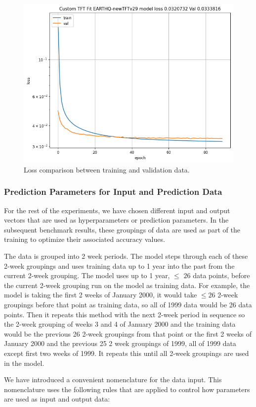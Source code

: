 \documentclass[utf8]{FrontiersinVancouver} %
\begin{document}
\begin{figure}[htb]
    \centering
    \includegraphics[width=0.70\columnwidth]{images/loss90.png}
    \caption{Loss comparison between training and validation data.}
    \label{fig:loss}
\end{figure}


\subsubsection{Prediction Parameters for Input and Prediction Data}

For the rest of the experiments, we have chosen different input and output vectors that are used as hyperparameters or prediction parameters. In the subsequent benchmark results, these groupings of data are used as part of the training to optimize their associated accuracy values. 

The data is grouped into 2 week periods. The model steps through each of these 2-week groupings and uses training data up to 1 year into the past from the current 2-week grouping. The model uses up to 1 year, $\leq$ $ 26$ data points, before the current 2-week grouping run on the model as training data. For example, the model is taking the first 2 weeks of January 2000, it would take $ \leq 26$ 2-week groupings before that point as training data, so all of 1999 data would be 26 data points. Then it repeats this method with the next 2-week period in sequence so the 2-week grouping of weeks 3 and 4 of January 2000 and the training data would be the previous 26 2-week groupings from that point or the first 2 weeks of January 2000 and the previous 25 2 week groupings of 1999, all of 1999 data except first two weeks of 1999. It repeats this until all 2-week groupings are used in the model.

We have introduced a convenient nomenclature for the data input. This nomenclature uses the following rules that are applied to control how parameters are used as input and output data:
\end{document}
